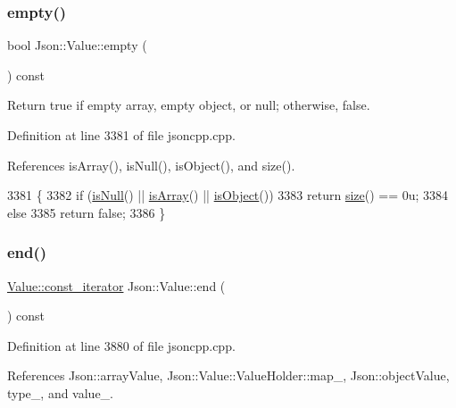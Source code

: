 \subsubsection{\texorpdfstring{empty()}{empty()}}
{\footnotesize\ttfamily bool Json\+::\+Value\+::empty (\begin{DoxyParamCaption}{ }\end{DoxyParamCaption}) const}



Return true if empty array, empty object, or null; otherwise, false. 



Definition at line 3381 of file jsoncpp.\+cpp.



References is\+Array(), is\+Null(), is\+Object(), and size().


\begin{DoxyCode}
3381                         \{
3382   \textcolor{keywordflow}{if} (\hyperlink{class_json_1_1_value_abde4070e21e46dc4f8203f66582cb19f}{isNull}() || \hyperlink{class_json_1_1_value_a1627eb9d6568d6d0252fa8bb711c0a59}{isArray}() || \hyperlink{class_json_1_1_value_a8cf96c0f2a552051fcfc78ffee60e037}{isObject}())
3383     \textcolor{keywordflow}{return} \hyperlink{class_json_1_1_value_a0ec2808e1d7efa4e9fad938d6667be44}{size}() == 0u;
3384   \textcolor{keywordflow}{else}
3385     \textcolor{keywordflow}{return} \textcolor{keyword}{false};
3386 \}
\end{DoxyCode}
\mbox{\label{class_json_1_1_value_a3e443cd0ef24f7e028b175e47ee045e0}} 
\subsubsection{\texorpdfstring{end()}{end()}\hspace{0.1cm}{\footnotesize\ttfamily [1/2]}}
{\footnotesize\ttfamily \hyperlink{class_json_1_1_value_af92282ca92b58b320debd486afb7696a}{Value\+::const\+\_\+iterator} Json\+::\+Value\+::end (\begin{DoxyParamCaption}{ }\end{DoxyParamCaption}) const}



Definition at line 3880 of file jsoncpp.\+cpp.



References Json\+::array\+Value, Json\+::\+Value\+::\+Value\+Holder\+::map\+\_\+, Json\+::object\+Value, type\+\_\+, and value\+\_\+.


